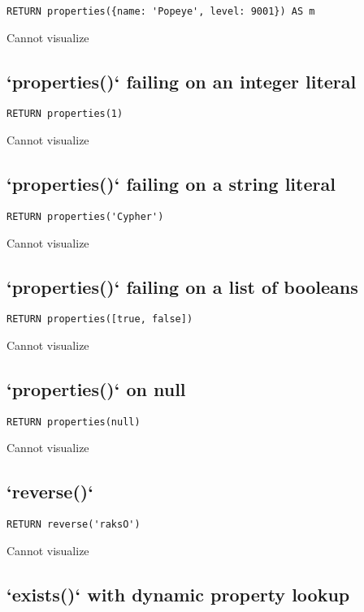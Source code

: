 \begin{lstlisting}
RETURN properties({name: 'Popeye', level: 9001}) AS m
\end{lstlisting}

Cannot visualize
\subsection{`properties()` failing on an integer literal}

\begin{lstlisting}
RETURN properties(1)
\end{lstlisting}

Cannot visualize
\subsection{`properties()` failing on a string literal}

\begin{lstlisting}
RETURN properties('Cypher')
\end{lstlisting}

Cannot visualize
\subsection{`properties()` failing on a list of booleans}

\begin{lstlisting}
RETURN properties([true, false])
\end{lstlisting}

Cannot visualize
\subsection{`properties()` on null}

\begin{lstlisting}
RETURN properties(null)
\end{lstlisting}

Cannot visualize
\subsection{`reverse()`}

\begin{lstlisting}
RETURN reverse('raksO')
\end{lstlisting}

Cannot visualize
\subsection{`exists()` with dynamic property lookup}

